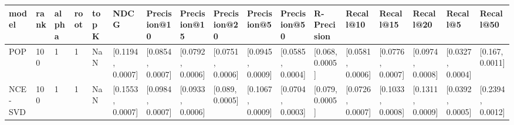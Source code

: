 \begin{tabular}{lllllllllllllllll}
\toprule
   model & rank & alpha & root & topK &              NDCG &      Precision@10 &      Precision@15 &      Precision@20 &       Precision@5 &      Precision@50 &      R-Precision &         Recall@10 &         Recall@15 &         Recall@20 &          Recall@5 &         Recall@50 \\
\midrule
     POP &  100 &     1 &    1 &  NaN &  [0.1194, 0.0007] &  [0.0854, 0.0007] &  [0.0792, 0.0006] &  [0.0751, 0.0006] &  [0.0945, 0.0009] &  [0.0585, 0.0004] &  [0.068, 0.0005] &  [0.0581, 0.0006] &  [0.0776, 0.0007] &  [0.0974, 0.0008] &  [0.0327, 0.0004] &   [0.167, 0.0011] \\
 NCE-SVD &  100 &     1 &    1 &  NaN &  [0.1553, 0.0007] &  [0.0984, 0.0007] &  [0.0933, 0.0006] &   [0.089, 0.0005] &  [0.1067, 0.0009] &  [0.0704, 0.0003] &  [0.079, 0.0005] &  [0.0726, 0.0007] &  [0.1033, 0.0008] &  [0.1311, 0.0009] &  [0.0392, 0.0005] &  [0.2394, 0.0012] \\
\bottomrule
\end{tabular}
